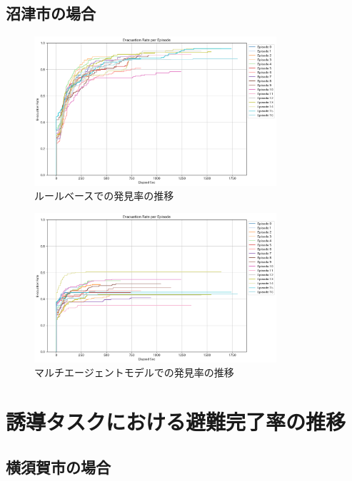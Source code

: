 \section{沼津市の場合}
\begin{figure}[H] 
  \centering 
  \includegraphics[width=0.8\textwidth]{Figures/NumazuSearch-RuleResult.png}
  \caption{ルールベースでの発見率の推移}
\end{figure}

\begin{figure}[H] 
  \centering 
  \includegraphics[width=0.8\textwidth]{Figures/NumazuSearch-AgentsResult.png}
  \caption{マルチエージェントモデルでの発見率の推移}
\end{figure}

\chapter{誘導タスクにおける避難完了率の推移}

\section{横須賀市の場合}


